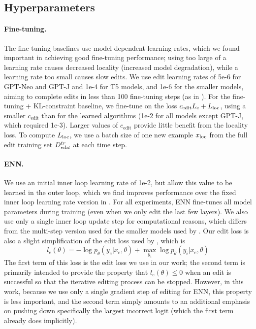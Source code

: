 \subsection{Hyperparameters}

\paragraph{Fine-tuning.} The fine-tuning baselines use model-dependent learning rates, which we found important in achieving good fine-tuning performance; using too large of a learning rate causes decreased locality (increased model degradation), while a learning rate too small causes slow edits. We use edit learning rates of 5e-6 for GPT-Neo and GPT-J and 1e-4 for T5 models, and 1e-6 for the smaller models, aiming to complete edits in less than 100 fine-tuning steps (as in \cite{Cao2021EditingFK}). For the fine-tuning + KL-constraint baseline, we fine-tune on the loss $c_\text{edit}L_\text{e} + L_\text{loc}$, using a smaller $c_\text{edit}$ than for the learned algorithms (1e-2 for all models except GPT-J, which required 1e-3). Larger values of $c_\text{edit}$ provide little benefit from the locality loss. To compute $L_\text{loc}$, we use a batch size of one new example $x_\text{loc}$ from the full edit training set $D^{tr}_{edit}$ at each time step. 

\paragraph{ENN.} We use an initial inner loop learning rate of 1e-2, but allow this value to be learned in the outer loop, which we find improves performance over the fixed inner loop learning rate version in \cite{Sinitsin2020Editable}. For all experiments, ENN fine-tunes all model parameters during training (even when we only edit the last few layers). We also use only a single inner loop update step for computational reasons, which differs from the multi-step version used for the smaller models used by \cite{Sinitsin2020Editable}. Our edit loss is also a slight simplification of the edit loss used by \cite{Sinitsin2020Editable}, which is
\begin{equation}
    l_e(\theta) = - \log p_\theta(y_e|x_e,\theta) + \max_{y_i} \log p_\theta(y_i|x_e, \theta) 
\end{equation}
The first term of this loss is the edit loss we use in our work; the second term is primarily intended to provide the property that $l_e(\theta) \le 0$ when an edit is successful so that the iterative editing process can be stopped. However, in this work, because we use only a single gradient step of editing for ENN, this property is less important, and the second term simply amounts to an additional emphasis on pushing down specifically the largest incorrect logit (which the first term already does implicitly).

